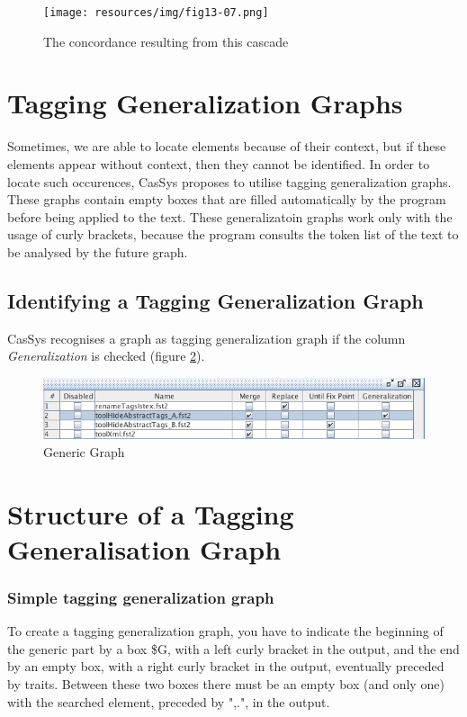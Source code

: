 \begin{figure}[!htb]
  \centering
  \texttt{[image: resources/img/fig13-07.png]}
  \caption{The concordance resulting from this cascade}
  \label{fig13-07}
\end{figure}


\section{Tagging Generalization Graphs}
Sometimes, we are able to locate elements because of their context, but if these elements appear without context, then they cannot be identified. In order to locate such occurences, CasSys proposes to utilise tagging generalization graphs. These graphs contain empty boxes that are filled automatically by the program before being applied to the text. These generalizatoin graphs work only with the usage of curly brackets, because the program consults the token list of the text to be analysed by the future graph.

\subsection{Identifying a Tagging Generalization Graph}
CasSys recognises a graph as tagging generalization graph if the column \emph{Generalization} is checked (figure \ref{fig12-3}).
\begin{figure}[!htb]
  \centering
  \includegraphics[width=15cm]{resources/img/fig12-3.png}
  \caption{Generic Graph}
  \label{fig12-3}
\end{figure}

\section{Structure of a Tagging Generalisation Graph}
\subsubsection{Simple tagging generalization graph}

To create a tagging generalization graph, you have to indicate the beginning of the generic part by a box \$G, with a left curly bracket in the output, and the end by an empty box, with a right curly bracket in the output, eventually preceded by traits. Between these two boxes there must be an empty box (and only one) with the searched element, preceded by ",.", in the output.

